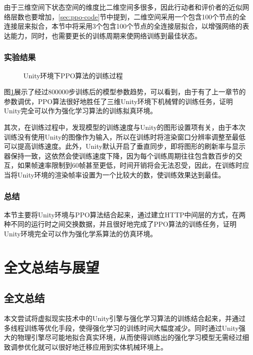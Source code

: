 \documentclass[bachelor]{thesis-uestc}
\begin{document}
	由于三维空间下状态空间的维度比二维空间多很多，因此行动者和评价者的近似网络层数也要增加，\ref{sec:ppo-code}节中提到，二维空间采用一个包含100个节点的全连接层来拟合，本节中将采用3个包含100个节点的全连接层拟合，以增强网络的表达能力，同时，也需要更长的训练周期来使网络训练到最佳状态。
	
	\subsection{实验结果}
	\begin{figure}[h]
		\centering
		\caption{Unity环境下PPO算法的训练过程}
		\label{fig:unity-res}
	\end{figure}
	图\ref{fig:unity-res}展示了经过800000步训练后的模型参数趋势，可以看到，由于有了上一章节的参数调优，PPO算法很好地胜任了三维Unity环境下机械臂的训练任务，证明Unity完全可以作为强化学习算法的训练拟真环境。
	
	其次，在训练过程中，发现模型的训练速度与Unity的图形设置项有关，由于本次训练没有使用Unity的图像作为输入，所以在训练时将渲染窗口分辨率调整至最低可以提高训练速度。此外，Unity默认开启了垂直同步，即将图形的刷新率与显示器保持一致，这依然会使训练速度下降，因为每个训练周期往往包含数百步的交互，如果帧速率限制到60帧甚至更低，时间开销将会无法忍受，因此，在训练时应当将Unity环境的渲染帧率设置为一个比较大的数，使训练效果达到最佳。

	\subsection{总结}
	本节主要将Unity环境与PPO算法结合起来，通过建立HTTP中间层的方式，在两种不同的运行时之间交换数据，并且很好地完成了PPO算法的训练任务，证明Unity环境完全可以作为强化学系算法的仿真环境。
	
	\chapter{全文总结与展望}
	\section{全文总结}
	本文尝试将虚拟现实技术中的Unity引擎与强化学习算法的训练结合起来，并通过多线程训练等优化手段，使得强化学习的训练时间大幅度减少。同时通过Unity强大的物理引擎尽可能地拟合真实环境，从而使得训练出的强化学习模型无需经过细致调参优化就可以很好地迁移应用到实体机械环境上。
	
\end{document}
